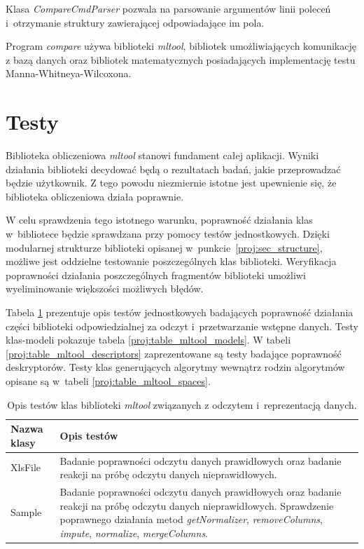 \documentclass[../thesis.tex]{subfiles}
\begin{document}
Klasa \emph{CompareCmdParser} pozwala na parsowanie argumentów linii poleceń i~otrzymanie struktury zawierającej odpowiadające im pola. 

Program \emph{compare} używa biblioteki \emph{mltool}, bibliotek umożliwiających komunikację z bazą danych oraz bibliotek matematycznych posiadających implementację testu Manna-Whitneya-Wilcoxona.

\section{Testy}

Biblioteka obliczeniowa \emph{mltool} stanowi fundament całej aplikacji. Wyniki działania biblioteki decydować będą o rezultatach badań, jakie przeprowadzać będzie użytkownik. Z tego powodu niezmiernie istotne jest upewnienie się, że biblioteka obliczeniowa działa poprawnie. 

W celu sprawdzenia tego istotnego warunku, poprawność działania klas w~bibliotece będzie sprawdzana przy pomocy testów jednostkowych. Dzięki modularnej strukturze biblioteki opisanej w~punkcie~\ref{proj:sec_structure}, możliwe jest oddzielne testowanie poszczególnych klas biblioteki. Weryfikacja poprawności działania poszczególnych fragmentów biblioteki umożliwi wyeliminowanie większości możliwych błędów.

Tabela \ref{proj:table_mltool_input} prezentuje opis testów jednostkowych badających poprawność działania części biblioteki odpowiedzialnej za odczyt i~przetwarzanie wstępne danych. Testy klas-modeli pokazuje tabela \ref{proj:table_mltool_models}. W tabeli \ref{proj:table_mltool_descriptors} zaprezentowane są testy badające poprawność deskryptorów. Testy klas generujących algorytmy wewnątrz rodzin algorytmów opisane są w~tabeli \ref{proj:table_mltool_spaces}.

\begin{table}[h]
\begin{center}
\begin{tabular}{ | l | p{110mm} | }
\hline
\rowcolor{lightgray} Nazwa klasy & Opis testów \\\hline

XlsFile & Badanie poprawności odczytu danych prawidłowych oraz badanie reakcji na próbę odczytu danych nieprawidłowych. \\\hline
Sample & Badanie poprawności odczytu danych prawidłowych oraz badanie reakcji na próbę odczytu danych nieprawidłowych. Sprawdzenie poprawnego działania metod \emph{getNormalizer}, \emph{removeColumns}, \emph{impute}, \emph{normalize}, \emph{mergeColumns}.\\\hline

\end{tabular}
\caption{Opis testów klas biblioteki \emph{mltool} związanych z odczytem i~reprezentacją danych.}
\label{proj:table_mltool_input}
\end{center}
\end{table}
\end{document}
